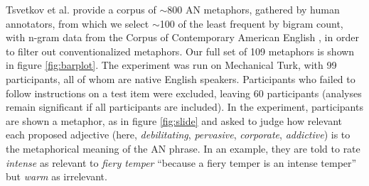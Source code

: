 \documentclass[9pt,twocolumn,twoside,lineno]{pnas-new}
\begin{document}
{		
		Tsvetkov et al. \cite{tsvetkov2014metaphor} provide a corpus of $\sim$800 AN metaphors, gathered by human annotators, from which we select $\sim$100 of the least frequent by bigram count, with n-gram data from the Corpus of Contemporary American English \cite{davies2011word}, in order to filter out conventionalized metaphors. Our full set of 109 metaphors is shown in figure \ref{fig:barplot}.
		The experiment was run on Mechanical Turk, with 99 participants, all of whom are native English speakers. Participants who failed to follow instructions on a test item were excluded, leaving 60 participants (analyses remain significant if all participants are included).
		In the experiment, participants are shown a metaphor, as in figure \ref{fig:slide} and asked to judge how relevant each proposed adjective (here, \emph{debilitating}, \emph{pervasive}, \emph{corporate}, \emph{addictive}) is to the metaphorical meaning of the AN phrase. In an example, they are told to rate \emph{intense} as relevant to \emph{fiery temper} ``because a fiery temper is an intense temper'' but \emph{warm} as irrelevant.

}

\showmatmethods{} %




\end{document}
